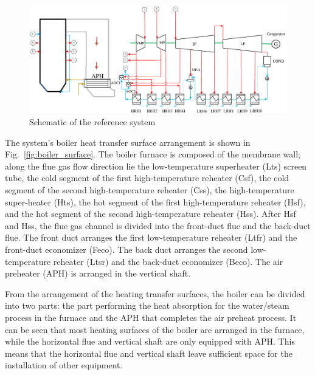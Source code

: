 \documentclass[preprint,12pt]{elsarticle}
\begin{document}
\begin{figure}[htbp]
\centering
\includegraphics[width=1\textwidth]{fig/reference_system}
\caption{Schematic of the reference system} 
\label{fig:reference_system}
\end{figure}
The system's boiler heat transfer surface arrangement is shown in Fig.~\ref{fig:boiler_surface}. 
The boiler furnace is composed of the membrane wall; along the flue gas flow direction lie the low-temperature superheater (Lts) screen tube, the cold segment of the first high-temperature reheater (Csf), the cold segment of the second high-temperature reheater (Css), the high-temperature super-heater (Hts), the hot segment of the first high-temperature reheater (Hsf), and the hot segment of the second high-temperature reheater (Hss).
After Hsf and Hss, the flue gas channel is divided into the front-duct flue and the back-duct flue.
The front duct arranges the first low-temperature reheater (Ltfr) and the front-duct economizer (Feco).
The back duct arranges the second low-temperature reheater (Ltsr) and the back-duct economizer (Beco).
The air preheater (APH) is arranged in the vertical shaft. %

From the arrangement of the heating transfer surfaces, the boiler can be divided into two parts: the part performing the heat absorption for the water/steam process in the furnace and the APH that completes the air preheat process.
It can be seen that most heating surfaces of the boiler are arranged in the furnace, while the horizontal flue and vertical shaft are only equipped with APH.
This means that the horizontal flue and vertical shaft leave sufficient space for the installation of other equipment.
\end{document}
